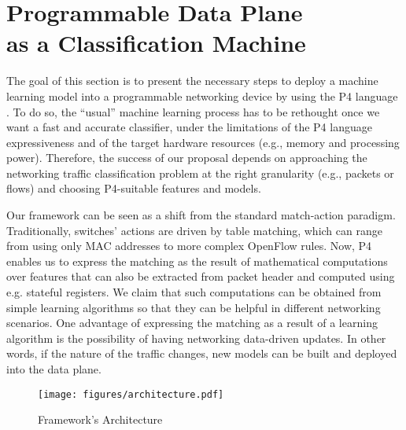 \section{Programmable Data Plane \\ as a Classification Machine }\label{sec:methodology}

The goal of this section is to present the necessary steps to deploy a machine learning model into a programmable networking device by using the P4 language \cite{P4}.
To do so, the ``usual'' machine learning process has to be rethought once we want a fast and accurate classifier, under the limitations of the P4 language expressiveness and of the target hardware resources (e.g., memory and processing power).
Therefore, the success of our proposal depends on approaching the networking traffic classification problem at the right granularity (e.g., packets or flows) and choosing P4-suitable features and models.

Our framework can be seen as a shift from the standard match-action paradigm. Traditionally, switches' actions are driven by table matching, which can range from using only MAC addresses to more complex OpenFlow \cite{OpenFlow} rules. Now, P4 enables us to express the matching as the result of mathematical computations over features that can also be extracted from packet header and computed using e.g. stateful registers. We claim that such computations can be obtained from simple learning algorithms so that they can be helpful in different networking scenarios. One advantage of expressing the matching as a result of a learning algorithm is the possibility of having networking data-driven updates. In other words, if the nature of the traffic changes, new models can be built and deployed into the data plane.

\begin{figure}[t] %
\centering
\texttt{[image: figures/architecture.pdf]}
\caption{Framework's Architecture}
\label{architecture}
\end{figure}

